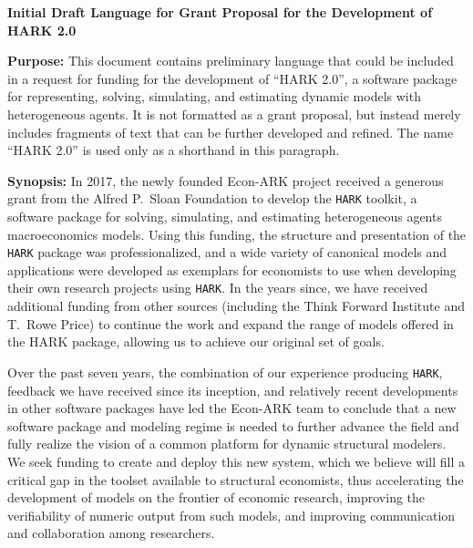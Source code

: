 \documentclass[12pt,pdftex,letterpaper]{article}
\begin{document}
\begin{center}
	\singlespacing \textbf{Initial Draft Language for Grant Proposal for the Development of HARK 2.0}
\end{center}

\noindent \textbf{Purpose:} This document contains preliminary language that could be included in a request for funding for the development of ``HARK 2.0'', a software package for representing, solving, simulating, and estimating dynamic models with heterogeneous agents. It is not formatted as a grant proposal, but instead merely includes fragments of text that can be further developed and refined.  The name ``HARK 2.0'' is used only as a shorthand in this paragraph. 

\vspace{0.5cm}

\noindent \textbf{Synopsis:} In 2017, the newly founded Econ-ARK project received a generous grant from the Alfred P.\ Sloan Foundation to develop the \texttt{HARK} toolkit, a software package for solving, simulating, and estimating heterogeneous agents macroeconomics models. Using this funding, the structure and presentation of the \texttt{HARK} package was professionalized, and a wide variety of canonical models and applications were developed as exemplars for economists to use when developing their own research projects using \texttt{HARK}. In the years since, we have received additional funding from other sources (including the Think Forward Institute and T.\ Rowe Price) to continue the work and expand the range of models offered in the HARK package, allowing us to achieve our original set of goals.

Over the past seven years, the combination of our experience producing \texttt{HARK}, feedback we have received since its inception, and relatively recent developments in other software packages have led the Econ-ARK team to conclude that a new software package and modeling regime is needed to further advance the field and fully realize the vision of a common platform for dynamic structural modelers. We seek funding to create and deploy this new system, which we believe will fill a critical gap in the toolset available to structural economists, thus accelerating the development of models on the frontier of economic research, improving the verifiability of numeric output from such models, and improving communication and collaboration among researchers.

\vspace{0.5cm}
\end{document}
